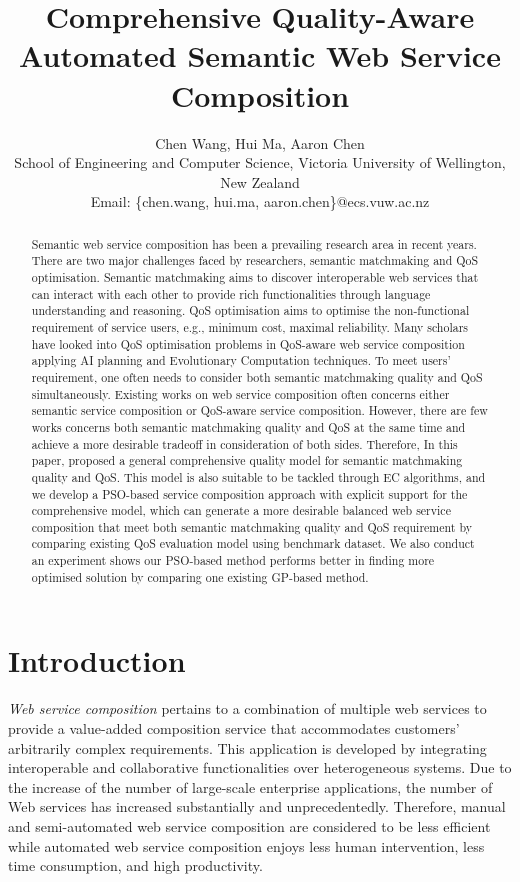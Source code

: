 \documentclass{IEEEtran}
\title{Comprehensive Quality-Aware Automated Semantic Web Service Composition}
\author{Chen Wang, Hui Ma, Aaron Chen\\ \small School of
Engineering and Computer Science, Victoria University of Wellington, New Zealand\\
Email: \{chen.wang, hui.ma, aaron.chen\}@ecs.vuw.ac.nz}
\begin{document}
\maketitle
\begin{abstract}
Semantic web service composition has been a prevailing research area in recent years. There are two major challenges faced by researchers, semantic matchmaking and QoS optimisation. Semantic matchmaking aims to discover interoperable web services that can interact with each other to provide rich functionalities through language understanding and reasoning. QoS optimisation aims to optimise the non-functional requirement of service users, e.g., minimum cost, maximal reliability. Many scholars have looked into QoS optimisation problems in QoS-aware web service composition applying AI planning and Evolutionary Computation techniques. To meet users' requirement, one often needs to consider both semantic matchmaking quality and QoS simultaneously. Existing works on web service composition often concerns either semantic service composition or QoS-aware service composition. However, there are few works concerns both semantic matchmaking quality and QoS at the same time and achieve a more desirable tradeoff in consideration of both sides. Therefore, In this paper, proposed a general comprehensive quality model for semantic matchmaking quality and QoS. This model is also suitable to be tackled through EC algorithms, and we develop a PSO-based service composition approach with explicit support for the comprehensive model, which can generate a more desirable balanced web service composition that meet both semantic matchmaking quality and QoS requirement by comparing existing QoS evaluation model using benchmark dataset. We also conduct an experiment shows our PSO-based method performs better in finding more optimised solution by comparing one existing GP-based method.

\end{abstract}
\section{Introduction}\label{introduction}

\textit{Web service composition} pertains to a combination of multiple web services to provide a value-added composition service that accommodates customers' arbitrarily complex requirements. This application is developed by integrating interoperable and collaborative functionalities over heterogeneous systems. Due to the increase of the number of large-scale enterprise applications, the number of Web services has increased substantially and unprecedentedly. Therefore, manual and semi-automated web service composition are considered to be less efficient while automated web service composition enjoys less human intervention, less time consumption, and high productivity.
\end{document}
